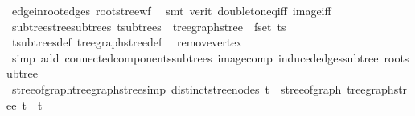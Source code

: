 \begin{isabellebody}
\ edge{\isacharunderscore}{\kern0pt}in{\isacharunderscore}{\kern0pt}root{\isacharunderscore}{\kern0pt}edges\ root{\isacharunderscore}{\kern0pt}stree{\isacharunderscore}{\kern0pt}wf\ \isamarkupfalse%
\ {\isacharparenleft}{\kern0pt}smt\ {\isacharparenleft}{\kern0pt}verit{\isacharparenright}{\kern0pt}\ doubleton{\isacharunderscore}{\kern0pt}eq{\isacharunderscore}{\kern0pt}iff\ image{\isacharunderscore}{\kern0pt}iff{\isacharparenright}{\kern0pt}\isanewline
{}\isamarkupfalse%
%
\endisatagproof
{\isafoldproof}%
%
\isadelimproof
\isanewline
%
\endisadelimproof
\isanewline
{}\isamarkupfalse%
\ subtrees{\isacharunderscore}{\kern0pt}tree{\isacharunderscore}{\kern0pt}subtrees{\isacharcolon}{\kern0pt}\ {\isachardoublequoteopen}t{\isachardot}{\kern0pt}subtrees\ {\isacharequal}{\kern0pt}\ tree{\isacharunderscore}{\kern0pt}graph{\isacharunderscore}{\kern0pt}stree\ {\isacharbackquote}{\kern0pt}\ fset\ ts{\isachardoublequoteclose}\isanewline
%
\isadelimproof
\ \ %
\endisadelimproof
%
\isatagproof
{}\isamarkupfalse%
\ t{\isachardot}{\kern0pt}subtrees{\isacharunderscore}{\kern0pt}def\ tree{\isacharunderscore}{\kern0pt}graph{\isacharunderscore}{\kern0pt}stree{\isacharunderscore}{\kern0pt}def\ \isamarkupfalse%
\ remove{\isacharunderscore}{\kern0pt}vertex\isanewline
\ \ \isamarkupfalse%
\ {\isacharparenleft}{\kern0pt}simp\ add{\isacharcolon}{\kern0pt}\ connected{\isacharunderscore}{\kern0pt}components{\isacharunderscore}{\kern0pt}subtrees\ image{\isacharunderscore}{\kern0pt}comp\ induced{\isacharunderscore}{\kern0pt}edges{\isacharunderscore}{\kern0pt}subtree\ root{\isacharunderscore}{\kern0pt}subtree{\isacharparenright}{\kern0pt}%
\endisatagproof
{\isafoldproof}%
%
\isadelimproof
\isanewline
%
\endisadelimproof
\isanewline
{}\isamarkupfalse%
\isanewline
\isanewline
{}\isamarkupfalse%
\ stree{\isacharunderscore}{\kern0pt}of{\isacharunderscore}{\kern0pt}graph{\isacharunderscore}{\kern0pt}tree{\isacharunderscore}{\kern0pt}graph{\isacharunderscore}{\kern0pt}stree{\isacharbrackleft}{\kern0pt}simp{\isacharbrackright}{\kern0pt}{\isacharcolon}{\kern0pt}\ {\isachardoublequoteopen}distinct{\isacharunderscore}{\kern0pt}stree{\isacharunderscore}{\kern0pt}nodes\ t\ {\isasymLongrightarrow}\ stree{\isacharunderscore}{\kern0pt}of{\isacharunderscore}{\kern0pt}graph\ {\isacharparenleft}{\kern0pt}tree{\isacharunderscore}{\kern0pt}graph{\isacharunderscore}{\kern0pt}stree\ t{\isacharparenright}{\kern0pt}\ {\isacharequal}{\kern0pt}\ t{\isachardoublequoteclose}\isanewline

\end{isabellebody}
